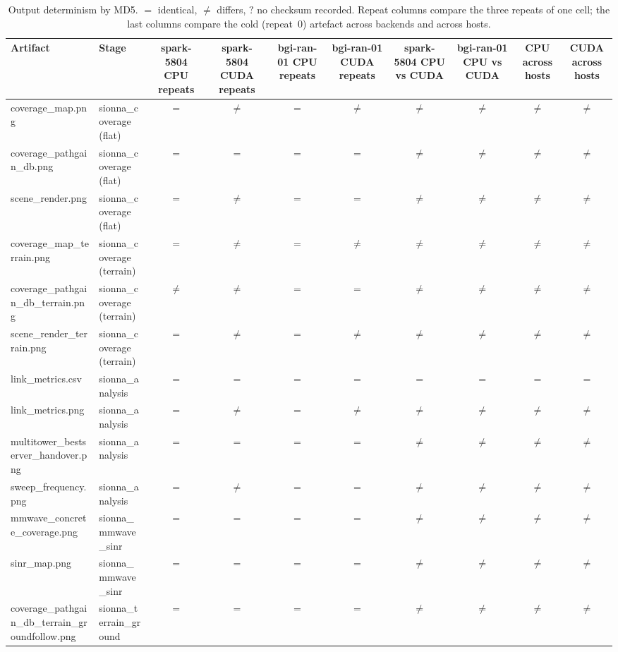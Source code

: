 \begin{table}[t]
  \centering
  \caption{Output determinism by MD5. $=$ identical, $\neq$ differs, $?$ no checksum recorded. Repeat columns compare the three repeats of one cell; the last columns compare the cold (repeat~0) artefact across backends and across hosts.}
  \label{tab:determinism}
  \begin{tabular}{llcccccccc}
    \toprule
    Artifact & Stage & spark-5804 CPU repeats & spark-5804 CUDA repeats & bgi-ran-01 CPU repeats & bgi-ran-01 CUDA repeats & spark-5804 CPU vs CUDA & bgi-ran-01 CPU vs CUDA & CPU across hosts & CUDA across hosts \\
    \midrule
    coverage\_map.png & sionna\_coverage (flat) & $=$ & $\neq$ & $=$ & $\neq$ & $\neq$ & $\neq$ & $\neq$ & $\neq$ \\
    coverage\_pathgain\_db.png & sionna\_coverage (flat) & $=$ & $=$ & $=$ & $=$ & $\neq$ & $\neq$ & $\neq$ & $\neq$ \\
    scene\_render.png & sionna\_coverage (flat) & $=$ & $\neq$ & $=$ & $=$ & $\neq$ & $\neq$ & $\neq$ & $\neq$ \\
    coverage\_map\_terrain.png & sionna\_coverage (terrain) & $=$ & $\neq$ & $=$ & $\neq$ & $\neq$ & $\neq$ & $\neq$ & $\neq$ \\
    coverage\_pathgain\_db\_terrain.png & sionna\_coverage (terrain) & $\neq$ & $\neq$ & $=$ & $=$ & $\neq$ & $\neq$ & $\neq$ & $\neq$ \\
    scene\_render\_terrain.png & sionna\_coverage (terrain) & $=$ & $\neq$ & $=$ & $\neq$ & $\neq$ & $\neq$ & $\neq$ & $\neq$ \\
    link\_metrics.csv & sionna\_analysis & $=$ & $=$ & $=$ & $=$ & $=$ & $=$ & $=$ & $=$ \\
    link\_metrics.png & sionna\_analysis & $=$ & $\neq$ & $=$ & $\neq$ & $\neq$ & $\neq$ & $\neq$ & $\neq$ \\
    multitower\_bestserver\_handover.png & sionna\_analysis & $=$ & $=$ & $=$ & $=$ & $\neq$ & $\neq$ & $\neq$ & $\neq$ \\
    sweep\_frequency.png & sionna\_analysis & $=$ & $\neq$ & $=$ & $=$ & $\neq$ & $\neq$ & $\neq$ & $\neq$ \\
    mmwave\_concrete\_coverage.png & sionna\_mmwave\_sinr & $=$ & $=$ & $=$ & $=$ & $\neq$ & $\neq$ & $\neq$ & $\neq$ \\
    sinr\_map.png & sionna\_mmwave\_sinr & $=$ & $=$ & $=$ & $=$ & $\neq$ & $\neq$ & $\neq$ & $\neq$ \\
    coverage\_pathgain\_db\_terrain\_groundfollow.png & sionna\_terrain\_ground & $=$ & $=$ & $=$ & $=$ & $\neq$ & $\neq$ & $\neq$ & $\neq$ \\
    \bottomrule
  \end{tabular}
\end{table}
